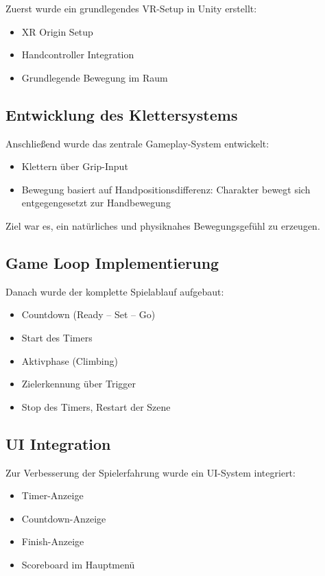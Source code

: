 \documentclass[11pt,a4paper]{article}
\begin{document}
Zuerst wurde ein grundlegendes VR-Setup in Unity erstellt:

\begin{itemize}
    \item XR Origin Setup
    \item Handcontroller Integration
    \item Grundlegende Bewegung im Raum
\end{itemize}

\subsection{Entwicklung des Klettersystems}

Anschließend wurde das zentrale Gameplay-System entwickelt:

\begin{itemize}
    \item Klettern über Grip-Input
    \item Bewegung basiert auf Handpositionsdifferenz: Charakter bewegt sich entgegengesetzt zur Handbewegung
\end{itemize}

Ziel war es, ein natürliches und physiknahes Bewegungsgefühl zu erzeugen.

\subsection{Game Loop Implementierung}

Danach wurde der komplette Spielablauf aufgebaut:

\begin{itemize}
    \item Countdown (Ready -- Set -- Go)
    \item Start des Timers
    \item Aktivphase (Climbing)
    \item Zielerkennung über Trigger
    \item Stop des Timers, Restart der Szene
\end{itemize}

\subsection{UI Integration}

Zur Verbesserung der Spielerfahrung wurde ein UI-System integriert:

\begin{itemize}
    \item Timer-Anzeige
    \item Countdown-Anzeige
    \item Finish-Anzeige
    \item Scoreboard im Hauptmenü
\end{itemize}
\end{document}
